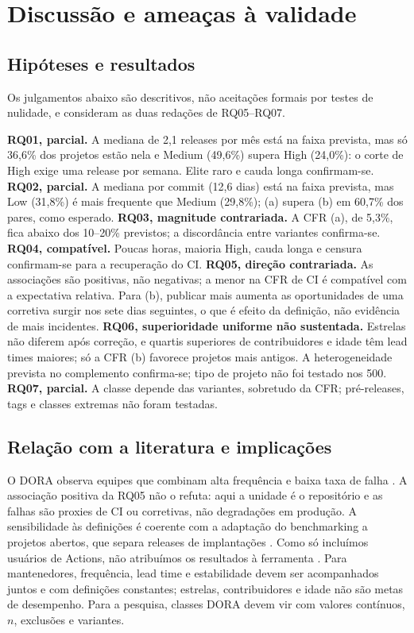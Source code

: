 \section{Discussão e ameaças à validade}
\label{sec:discussao}
\subsection{Hipóteses e resultados}
\label{sec:confronto-hipoteses}
Os julgamentos abaixo são descritivos, não aceitações formais por testes de
nulidade, e consideram as duas redações de RQ05--RQ07.

\textbf{RQ01, parcial.} A mediana de 2,1 releases por mês está na faixa
prevista, mas só 36,6\% dos projetos estão nela e Medium (49,6\%) supera High
(24,0\%): o corte de High exige uma release por semana. Elite raro e cauda
longa confirmam-se. \textbf{RQ02, parcial.} A mediana por commit (12,6 dias)
está na faixa prevista, mas Low (31,8\%) é mais frequente que Medium (29,8\%);
(a) supera (b) em 60,7\% dos pares, como esperado. \textbf{RQ03, magnitude
contrariada.} A CFR (a), de 5,3\%, fica abaixo dos 10--20\% previstos; a
discordância entre variantes confirma-se. \textbf{RQ04, compatível.} Poucas
horas, maioria High, cauda longa e censura confirmam-se para a recuperação do
CI. \textbf{RQ05, direção contrariada.} As associações são positivas, não
negativas; a menor na CFR de CI é compatível com a expectativa relativa. Para
(b), publicar mais aumenta as oportunidades de uma corretiva surgir nos sete
dias seguintes, o que é efeito da definição, não evidência de mais incidentes.
\textbf{RQ06, superioridade uniforme não sustentada.} Estrelas não diferem
após correção, e quartis superiores de contribuidores e idade têm lead times
maiores; só a CFR (b) favorece projetos mais antigos. A heterogeneidade prevista
no complemento confirma-se; tipo de projeto não foi testado nos 500.
\textbf{RQ07, parcial.} A classe depende das variantes, sobretudo da CFR;
pré-releases, tags e classes extremas não foram testadas.

\subsection{Relação com a literatura e implicações}
\label{sec:discussao-literatura}
\label{sec:implicacoes}
O DORA observa equipes que combinam alta frequência e baixa taxa de falha
\cite{dora2021}. A associação positiva da RQ05 não o refuta: aqui a unidade é
o repositório e as falhas são proxies de CI ou corretivas, não degradações em
produção. A sensibilidade às definições é coerente com a adaptação do
benchmarking a projetos abertos, que separa releases de implantações
\cite{sanchezruiz2023benchmarking}. Como só incluímos usuários de Actions,
não atribuímos os resultados à ferramenta \cite{kinsman2021actions}. Para
mantenedores, frequência, lead time e estabilidade devem ser acompanhados
juntos e com definições constantes; estrelas, contribuidores e idade não são
metas de desempenho. Para a pesquisa, classes DORA devem vir com valores
contínuos, $n$, exclusões e variantes.

